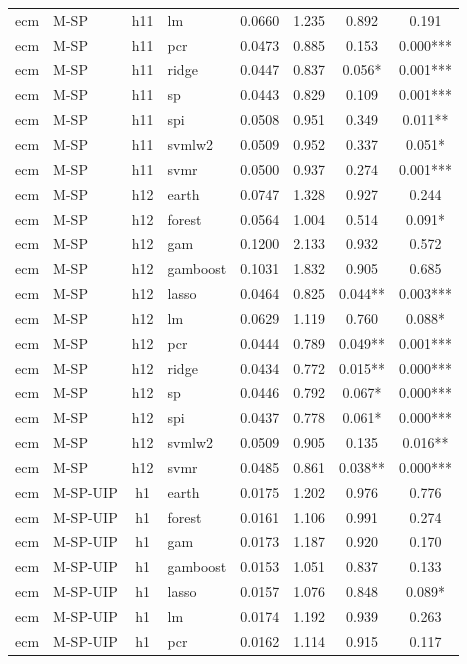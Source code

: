 \begin{ThreePartTable}
\begin{longtable}[t]{llclcccc}
ecm & M-SP & h11 & lm & 0.0660 & 1.235 & 0.892 & 0.191\\
ecm & M-SP & h11 & pcr & 0.0473 & 0.885 & 0.153 & 0.000***\\
ecm & M-SP & h11 & ridge & 0.0447 & 0.837 & 0.056* & 0.001***\\
ecm & M-SP & h11 & sp & 0.0443 & 0.829 & 0.109 & 0.001***\\
ecm & M-SP & h11 & spi & 0.0508 & 0.951 & 0.349 & 0.011**\\
ecm & M-SP & h11 & svmlw2 & 0.0509 & 0.952 & 0.337 & 0.051*\\
ecm & M-SP & h11 & svmr & 0.0500 & 0.937 & 0.274 & 0.001***\\
\addlinespace
ecm & M-SP & h12 & earth & 0.0747 & 1.328 & 0.927 & 0.244\\
ecm & M-SP & h12 & forest & 0.0564 & 1.004 & 0.514 & 0.091*\\
ecm & M-SP & h12 & gam & 0.1200 & 2.133 & 0.932 & 0.572\\
ecm & M-SP & h12 & gamboost & 0.1031 & 1.832 & 0.905 & 0.685\\
ecm & M-SP & h12 & lasso & 0.0464 & 0.825 & 0.044** & 0.003***\\
ecm & M-SP & h12 & lm & 0.0629 & 1.119 & 0.760 & 0.088*\\
ecm & M-SP & h12 & pcr & 0.0444 & 0.789 & 0.049** & 0.001***\\
ecm & M-SP & h12 & ridge & 0.0434 & 0.772 & 0.015** & 0.000***\\
ecm & M-SP & h12 & sp & 0.0446 & 0.792 & 0.067* & 0.000***\\
ecm & M-SP & h12 & spi & 0.0437 & 0.778 & 0.061* & 0.000***\\
ecm & M-SP & h12 & svmlw2 & 0.0509 & 0.905 & 0.135 & 0.016**\\
ecm & M-SP & h12 & svmr & 0.0485 & 0.861 & 0.038** & 0.000***\\
\addlinespace
ecm & M-SP-UIP & h1 & earth & 0.0175 & 1.202 & 0.976 & 0.776\\
ecm & M-SP-UIP & h1 & forest & 0.0161 & 1.106 & 0.991 & 0.274\\
ecm & M-SP-UIP & h1 & gam & 0.0173 & 1.187 & 0.920 & 0.170\\
ecm & M-SP-UIP & h1 & gamboost & 0.0153 & 1.051 & 0.837 & 0.133\\
ecm & M-SP-UIP & h1 & lasso & 0.0157 & 1.076 & 0.848 & 0.089*\\
ecm & M-SP-UIP & h1 & lm & 0.0174 & 1.192 & 0.939 & 0.263\\
ecm & M-SP-UIP & h1 & pcr & 0.0162 & 1.114 & 0.915 & 0.117\\

\end{longtable}
\end{ThreePartTable}
